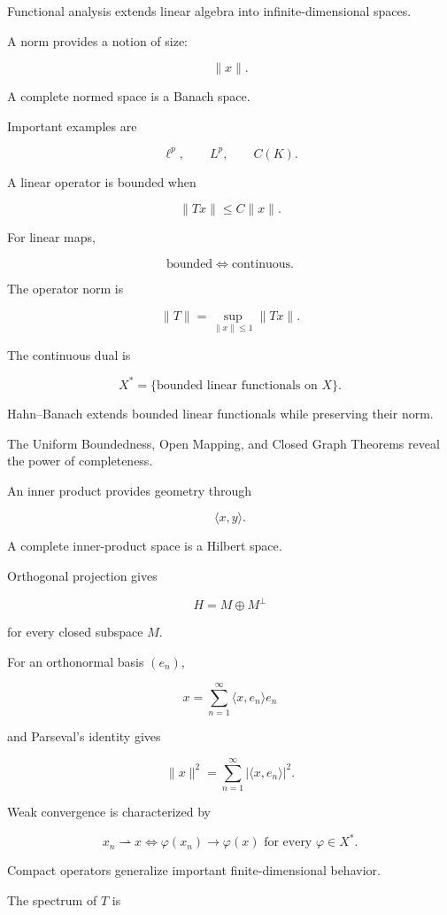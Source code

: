 Functional analysis extends linear algebra into infinite-dimensional
spaces.

A norm provides a notion of size:

\[
\boxed{
\|x\|.
}
\]

A complete normed space is a Banach space.

Important examples are

\[
\boxed{
\ell^p,
\qquad
L^p,
\qquad
C(K).
}
\]

A linear operator is bounded when

\[
\boxed{
\|Tx\|
\leq
C\|x\|.
}
\]

For linear maps,

\[
\boxed{
\text{bounded}
\iff
\text{continuous}.
}
\]

The operator norm is

\[
\boxed{
\|T\|
=
\sup_{\|x\|\leq1}\|Tx\|.
}
\]

The continuous dual is

\[
\boxed{
X^*
=
\{\text{bounded linear functionals on }X\}.
}
\]

Hahn--Banach extends bounded linear functionals while preserving their
norm.

The Uniform Boundedness, Open Mapping, and Closed Graph Theorems reveal
the power of completeness.

An inner product provides geometry through

\[
\boxed{
\langle x,y\rangle.
}
\]

A complete inner-product space is a Hilbert space.

Orthogonal projection gives

\[
\boxed{
H=M\oplus M^\perp
}
\]

for every closed subspace \(M\).

For an orthonormal basis \((e_n)\),

\[
\boxed{
x
=
\sum_{n=1}^{\infty}
\langle x,e_n\rangle e_n
}
\]

and Parseval's identity gives

\[
\boxed{
\|x\|^2
=
\sum_{n=1}^{\infty}
|\langle x,e_n\rangle|^2.
}
\]

Weak convergence is characterized by

\[
\boxed{
x_n\rightharpoonup x
\iff
\varphi(x_n)\to\varphi(x)
\text{ for every }\varphi\in X^*.
}
\]

Compact operators generalize important finite-dimensional behavior.

The spectrum of \(T\) is

